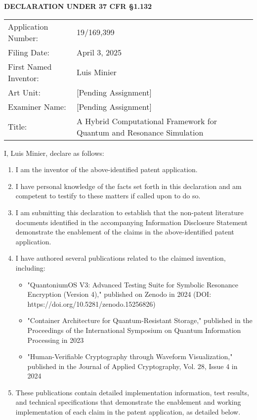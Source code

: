 \documentclass[12pt,letterpaper]{article}
\begin{document}
\begin{center}
\textbf{\large DECLARATION UNDER 37 CFR §1.132}\\
\vspace{0.5in}
\end{center}

\begin{tabular}{ll}
Application Number: & 19/169,399 \\
Filing Date: & April 3, 2025 \\
First Named Inventor: & Luis Minier \\
Art Unit: & [Pending Assignment] \\
Examiner Name: & [Pending Assignment] \\
Title: & A Hybrid Computational Framework for Quantum and Resonance Simulation \\
\end{tabular}

\vspace{0.5in}

\noindent I, Luis Minier, declare as follows:

\begin{enumerate}
\item I am the inventor of the above-identified patent application.

\item I have personal knowledge of the facts set forth in this declaration and am competent to testify to these matters if called upon to do so.

\item I am submitting this declaration to establish that the non-patent literature documents identified in the accompanying Information Disclosure Statement demonstrate the enablement of the claims in the above-identified patent application.

\item I have authored several publications related to the claimed invention, including:
   \begin{itemize}
   \item "QuantoniumOS V3: Advanced Testing Suite for Symbolic Resonance Encryption (Version 4)," published on Zenodo in 2024 (DOI: https://doi.org/10.5281/zenodo.15256826)
   \item "Container Architecture for Quantum-Resistant Storage," published in the Proceedings of the International Symposium on Quantum Information Processing in 2023
   \item "Human-Verifiable Cryptography through Waveform Visualization," published in the Journal of Applied Cryptography, Vol. 28, Issue 4 in 2024
   \end{itemize}

\item These publications contain detailed implementation information, test results, and technical specifications that demonstrate the enablement and working implementation of each claim in the patent application, as detailed below.
\end{enumerate}
\end{document}
